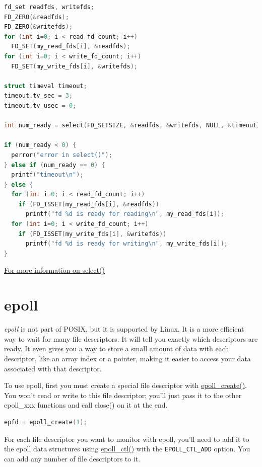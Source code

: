 \begin{lstlisting}[language=C]
fd_set readfds, writefds;
FD_ZERO(&readfds);
FD_ZERO(&writefds);
for (int i=0; i < read_fd_count; i++)
  FD_SET(my_read_fds[i], &readfds);
for (int i=0; i < write_fd_count; i++)
  FD_SET(my_write_fds[i], &writefds);

struct timeval timeout;
timeout.tv_sec = 3;
timeout.tv_usec = 0;

int num_ready = select(FD_SETSIZE, &readfds, &writefds, NULL, &timeout);

if (num_ready < 0) {
  perror("error in select()");
} else if (num_ready == 0) {
  printf("timeout\n");
} else {
  for (int i=0; i < read_fd_count; i++)
    if (FD_ISSET(my_read_fds[i], &readfds))
      printf("fd %d is ready for reading\n", my_read_fds[i]);
  for (int i=0; i < write_fd_count; i++)
    if (FD_ISSET(my_write_fds[i], &writefds))
      printf("fd %d is ready for writing\n", my_write_fds[i]);
}
\end{lstlisting}

\href{http://pubs.opengroup.org/onlinepubs/9699919799/functions/select.html}{For more information on select()}

\section{epoll}\label{epoll}

\emph{epoll} is not part of POSIX, but it is supported by Linux. It is a more efficient way to wait for many file descriptors. It will tell you exactly which descriptors are ready. It even gives you a way to store a small amount of data with each descriptor, like an array index or a pointer, making it easier to access your data associated with that descriptor.

To use epoll, first you must create a special file descriptor with \href{http://linux.die.net/man/2/epoll_create}{epoll\_create()}. You won't read or write to this file descriptor; you'll just pass it to the other epoll\_xxx functions and call close() on it at the end.

\begin{lstlisting}[language=C]
    epfd = epoll_create(1);
\end{lstlisting}

For each file descriptor you want to monitor with epoll, you'll need to add it to the epoll data structures using \href{http://linux.die.net/man/2/epoll_ctl}{epoll\_ctl()} with the \texttt{EPOLL\_CTL\_ADD} option. You can add any number of file descriptors to it.

